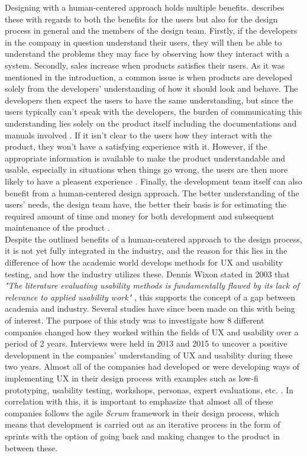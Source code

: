 \noindent
Designing with a human-centered approach holds multiple benefits. \textcite{WEB:UXBenefits} describes these with regards to both the benefits for the users but also for the design process in general and the members of the design team. Firstly, if the developers in the company in question understand their users, they will then be able to understand the problems they may face by observing how they interact with a system. Secondly, sales increase when products satisfies their users. As it was mentioned in the introduction, a common issue is when products are developed solely from the developers' understanding of how it should look and behave. The developers then expect the users to have the same understanding, but since the users typically can't speak with the developers, the burden of communicating this understanding lies solely on the product itself including the documentations and manuals involved \parencite[][31]{PDF:DonNorman}. If it isn't clear to the users how they interact with the product, they won't have a satisfying experience with it. However, if the appropriate information is available to make the product understandable and usable, especially in situations when things go wrong, the users are then more likely to have a pleasent experience \parencite[][32]{PDF:DonNorman}. Finally, the development team itself can also benefit from a human-centered design approach. The better understanding of the users' needs, the design team have, the better their basis is for estimating the required amount of time and money for both development and subsequent maintenance of the product \parencite{WEB:UXBenefits}.\\

\noindent
Despite the outlined benefits of a human-centered approach to the design process, it is not yet fully integrated in the industry, and the reason for this lies in the difference of how the academic world develops methods for UX and usability testing, and how the industry utilizes these. Dennis Wixon stated in 2003 that \textit{"The literature evaluating usability methods is fundamentally flawed by its lack of relevance to applied usability work"} \parencite{WEB:WixonUXindustry}, this supports the concept of a gap between academia and industry. Several studies have since been made on this with \textcite{WEB:TinaOgLarsBo} being of interest. The purpose of this study was to investigate how 8 different companies changed how they worked within the fields of UX and usability over a period of 2 years. Interviews were held in 2013 and 2015 to uncover a positive development in the companies' understanding of UX and usability during these two years. Almost all of the companies had developed or were developing ways of implementing UX in their design process with examples such as low-fi prototyping, usability testing, workshops, personas, expert evaluations, etc. \parencite[][48]{WEB:TinaOgLarsBo}. In correlation with this, it is important to emphasize that almost all of these companies follows the agile \textit{Scrum} framework in their design process, which means that development is carried out as an iterative process in the form of sprints with the option of going back and making changes to the product in between these.\\


